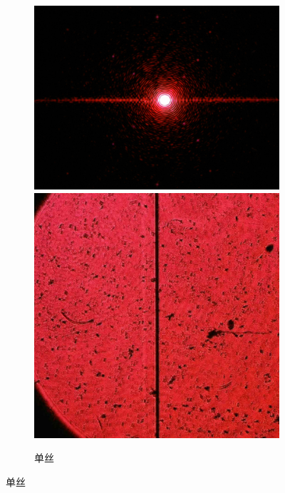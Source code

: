 \documentclass[a4paper]{article}
\begin{document}
\begin{figure}[htbp]
\begin{subfigure}[htbp]{0.3\textwidth}
    \end{subfigure}
    \begin{subfigure}[htbp]{0.3\textwidth}
        \centering
        \includegraphics[width=\textwidth]{fre-done/3-4.JPG}
        \includegraphics[width=\textwidth]{img-done/3-4.JPG}
        \caption{单丝}
        \label{3-4}
    \end{subfigure}

\end{figure}
\end{document}
